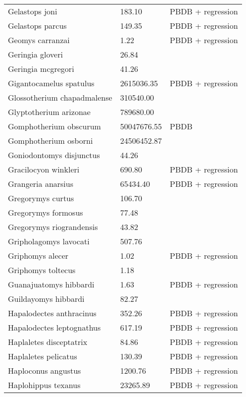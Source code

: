 \documentclass{article}
\begin{document}
\begin{center}
\begin{longtable}{p{} p{} p{}}
    Gelastops joni & 183.10 & PBDB + regression \\ 
    Gelastops parcus & 149.35 & PBDB + regression \\ 
    Geomys carranzai & 1.22 & PBDB + regression \\ 
    Geringia gloveri & 26.84 & \cite{Tomiya2013} \\ 
    Geringia mcgregori & 41.26 & \cite{Tomiya2013} \\ 
    Gigantocamelus spatulus & 2615036.35 & PBDB + regression \\ 
    Glossotherium chapadmalense & 310540.00 & \cite{McDonald2005} \\ 
    Glyptotherium arizonae & 789680.00 & \cite{McDonald2005} \\ 
    Gomphotherium obscurum & 50047676.55 & PBDB \\ 
    Gomphotherium osborni & 24506452.87 & \cite{Wang2014} \\ 
    Goniodontomys disjunctus & 44.26 & \cite{Tomiya2013} \\ 
    Gracilocyon winkleri & 690.80 & PBDB + regression \\ 
    Grangeria anarsius & 65434.40 & PBDB + regression \\ 
    Gregorymys curtus & 106.70 & \cite{Tomiya2013} \\ 
    Gregorymys formosus & 77.48 & \cite{Tomiya2013} \\ 
    Gregorymys riograndensis & 43.82 & \cite{Tomiya2013} \\ 
    Gripholagomys lavocati & 507.76 & \cite{Tomiya2013} \\ 
    Griphomys alecer & 1.02 & PBDB + regression \\ 
    Griphomys toltecus & 1.18 & \cite{Mihlbachler2006} \\ 
    Guanajuatomys hibbardi & 1.63 & PBDB + regression \\ 
    Guildayomys hibbardi & 82.27 & \cite{Tomiya2013} \\ 
    Hapalodectes anthracinus & 352.26 & PBDB + regression \\ 
    Hapalodectes leptognathus & 617.19 & PBDB + regression \\ 
    Haplaletes disceptatrix & 84.86 & PBDB + regression \\ 
    Haplaletes pelicatus & 130.39 & PBDB + regression \\ 
    Haploconus angustus & 1200.76 & PBDB + regression \\ 
    Haplohippus texanus & 23265.89 & PBDB + regression \\ 

\end{longtable}
\end{center}
\end{document}
